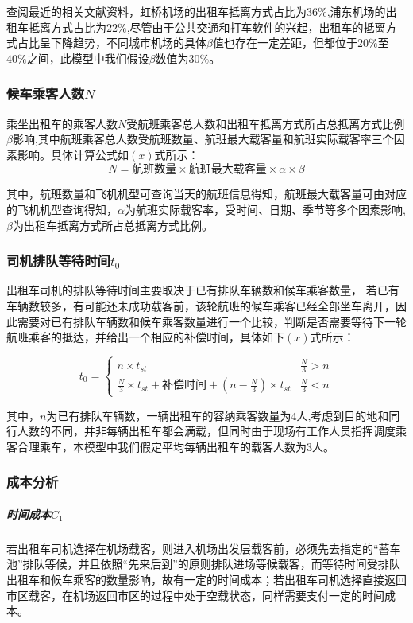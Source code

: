 \documentclass[withoutpreface,bwprint]{cumcmthesis} %
\begin{document}
查阅最近的相关文献资料，虹桥机场的出租车抵离方式占比为$36\%$\cite{bib:two},浦东机场的出租车抵离方式占比为$22\%$\cite{bib:three},尽管由于公共交通和打车软件的兴起，出租车的抵离方式占比呈下降趋势，不同城市机场的具体$\beta$值也存在一定差距，但都位于$20\%$至$40\%$之间，此模型中我们假设$\beta$数值为$30\%$。


\subsubsection{候车乘客人数$N$}
乘坐出租车的乘客人数$N$受航班乘客总人数和出租车抵离方式所占总抵离方式比例$\beta$影响,其中航班乘客总人数受航班数量、航班最大载客量和航班实际载客率三个因素影响。具体计算公式如$(x)$式所示：
\begin{equation}
N=\mbox{航班数量}\times\mbox{航班最大载客量}\times\alpha\times\beta
\end{equation}

其中，航班数量和飞机机型可查询当天的航班信息得知，航班最大载客量可由对应的飞机机型查询得知，$\alpha$为航班实际载客率，受时间、日期、季节等多个因素影响,$\beta$为出租车抵离方式所占总抵离方式比例。


\subsubsection{司机排队等待时间$t_0$}出租车司机的排队等待时间主要取决于已有排队车辆数和候车乘客数量，
若已有车辆数较多，有可能还未成功载客前，该轮航班的候车乘客已经全部坐车离开，因此需要对已有排队车辆数和候车乘客数量进行一个比较，判断是否需要等待下一轮航班乘客的抵达，并给出一个相应的补偿时间，具体如下$(x)$式所示：

\begin{equation}
t_0=
\begin{cases}
n\times t_{st}&  \frac{N}{3} > n\\
\frac{N}{3} \times t_{st} + \mbox{补偿时间}+(n-\frac{N}{3})\times t_{st} &  \frac{N}{3}< n
\end{cases}
\end{equation}

其中，$n$为已有排队车辆数，一辆出租车的容纳乘客数量为$4$人,考虑到目的地和同行人数的不同，并非每辆出租车都会满载，但同时由于现场有工作人员指挥调度乘客合理乘车，本模型中我们假定平均每辆出租车的载客人数为$3$人。
\subsubsection{成本分析}

\subparagraph{时间成本$C_1$}若出租车司机选择在机场载客，则进入机场出发层载客前，必须先去指定的“蓄车池”排队等候，并且依照“先来后到”的原则排队进场等候载客，而等待时间受排队出租车和候车乘客的数量影响，故有一定的时间成本；若出租车司机选择直接返回市区载客，在机场返回市区的过程中处于空载状态，同样需要支付一定的时间成本。
\end{document}
